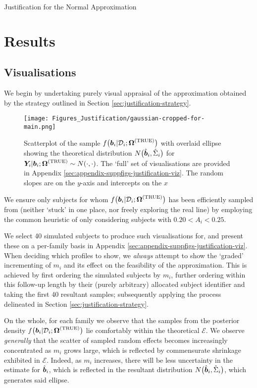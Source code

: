 \begin{chapter}{\label{cha:justification}Justification for the Normal Approximation}
  \section{Results}\label{sec:justification-results}
  \subsection{Visualisations}\label{sec:justification-results-visualisations}
  We begin by undertaking purely visual appraisal of the approximation obtained by the strategy outlined in Section \ref{sec:justification-strategy}. 

  \begin{figure}[ht]
      \centering
      \texttt{[image: Figures\_Justification/gaussian-cropped-for-main.png]}
      \caption{Scatterplot of the sample $f\big(\bm{b}_i|\mathcal{D}_i;\bm{\mathrm{\Omega}}^{(\mathrm{TRUE})}\big)$ with overlaid ellipse showing the theoretical distribution $N\big(\hat{\bm{b}}_i,\hat{\Sigma}_i\big)$ for $\bm{Y}_i|\bm{b}_i;\bm{\mathrm{\Omega}}^{(\mathrm{TRUE})}\sim N\!\left(\cdot,\cdot\right)$. The `full' set of visualisations are provided in Appendix \ref{sec:appendix-suppfigs-justification-viz}. The random slopes are on the $y$-axis and intercepts on the $x$}
      \label{fig:justification-gaussian-cropped}
  \end{figure}
  
  We ensure only subjects for whom $f\big(\bm{b}_i|\mathcal{D}_i;\bm{\mathrm{\Omega}}^{(\mathrm{TRUE})}\big)$ has been efficiently sampled from (\ie neither `stuck' in one place, nor freely exploring the real line) by employing the common heuristic of only considering subjects with $0.20<A_i<0.25$. 
  
  We select 40 simulated subjects to produce such visualisations for, and present these on a per-family basis in Appendix \ref{sec:appendix-suppfigs-justification-viz}. When deciding which profiles to show, we \textit{always} attempt to show the `graded' incrementing of $m_i$ and its effect on the feasibility of the approximation. This is achieved by first ordering the simulated subjects by $m_i$, further ordering within this follow-up length by their (purely arbitrary) allocated subject identifier and taking the first 40 resultant samples; subsequently applying the process delineated in Section \ref{sec:justification-strategy}.

  On the whole, for each family we observe that the samples from the posterior density $f\big(\bm{b}_i|\mathcal{D}_i;\bm{\mathrm{\Omega}}^{(\mathrm{TRUE})}\big)$ lie comfortably within the theoretical $\mathcal{E}$. We observe \textit{generally} that the scatter of sampled random effects becomes increasingly concentrated as $m_i$ grows large, which is reflected by commensurate shrinkage exhibited in $\mathcal{E}$. Indeed, as $m_i$ increases, there will be less uncertainty in the estimate for $\hat{\bm{b}}_i$, which is reflected in the resultant distribution $N\big(\hat{\bm{b}}_i,\hat{\Sigma}_i\big)$, which generates said ellipse. 


\end{chapter}

